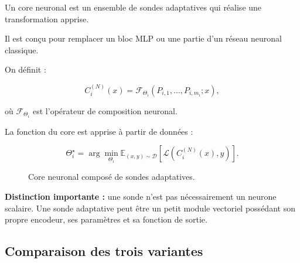 \documentclass[11pt,a4paper]{article}
\begin{document}
Un core neuronal est un ensemble de sondes adaptatives qui réalise
une transformation apprise.

Il est conçu pour remplacer un bloc MLP ou une partie d'un réseau
neuronal classique.

On définit :

\[
C_i^{(N)}(x)
=
\mathcal{F}_{\Theta_i}
(P_{i,1},\ldots,P_{i,m_i};x),
\]

où $\mathcal{F}_{\Theta_i}$ est l'opérateur de composition neuronal.

La fonction du core est apprise à partir de données :

\[
\Theta_i^\star
=
\arg\min_{\Theta_i}
\mathbb{E}_{(x,y)\sim\mathcal{D}}
\left[
\mathcal{L}
\left(
C_i^{(N)}(x),y
\right)
\right].
\]

\begin{figure}[H]
\centering
{}
\caption{Core neuronal composé de sondes adaptatives.}
\end{figure}

\textbf{Distinction importante :} une sonde n'est pas nécessairement
un neurone scalaire. Une sonde adaptative peut être un petit module
vectoriel possédant son propre encodeur, ses paramètres et sa fonction
de sortie.

\subsection{Comparaison des trois variantes}
\end{document}
